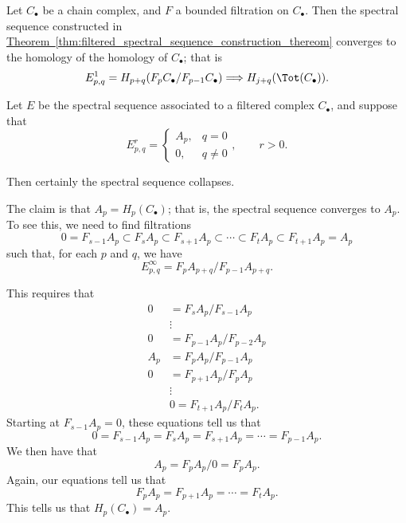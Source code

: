 \documentclass[main.tex]{subfiles}
\begin{document}
\begin{theorem}
  Let $C_{\bullet}$ be a chain complex, and $F$ a bounded filtration on $C_{\bullet}$. Then the spectral sequence constructed in \hyperref[thm:filtered_spectral_sequence_construction_thereom]{Theorem~\ref*{thm:filtered_spectral_sequence_construction_thereom}} converges to the homology of the homology of $C_{\bullet}$; that is
  \begin{equation*}
    E^{1}_{p,q} = H_{p+q}(F_{p}C_{\bullet}/F_{p-1}C_{\bullet}) \Longrightarrow H_{j+q}(\Tot(C_{\bullet})).
  \end{equation*}
\end{theorem}

\begin{example}
  Let $E$ be the spectral sequence associated to a filtered complex $C_{\bullet}$, and suppose that
  \begin{equation*}
    E^{r}_{p, q} =
    \begin{cases}
      A_{p}, &q = 0 \\
      0, &q \neq 0
    \end{cases},\qquad r > 0.
  \end{equation*}

  Then certainly the spectral sequence collapses.

  The claim is that $A_{p} = H_{p}(C_{\bullet})$; that is, the spectral sequence converges to $A_{p}$. To see this, we need to find filtrations
  \begin{equation*}
    0 = F_{s-1}A_{p} \subset F_{s}A_{p} \subset F_{s+1}A_{p} \subset \cdots \subset F_{t}A_{p} \subset F_{t+1}A_{p} = A_{p}
  \end{equation*}
  such that, for each $p$ and $q$, we have
  \begin{equation*}
    E^{\infty}_{p, q} = F_{p}A_{p+q}/F_{p-1}A_{p+q}.
  \end{equation*}

  This requires that
  \begin{align*}
    0 &= F_{s}A_{p}/F_{s-1}A_{p} \\
    &\vdots \\
    0 &= F_{p-1}A_{p}/F_{p-2}A_{p} \\
    A_{p} &= F_{p}A_{p}/F_{p-1}A_{p} \\
    0 &= F_{p+1}A_{p}/F_{p}A_{p} \\
    &\vdots \\
    & 0 = F_{t+1}A_{p}/F_{t}A_{p}.
  \end{align*}
  Starting at $F_{s-1}A_{p} = 0$, these equations tell us that
  \begin{equation*}
    0 = F_{s-1}A_{p} = F_{s}A_{p} = F_{s+1}A_{p} = \cdots = F_{p-1}A_{p}.
  \end{equation*}
  We then have that
  \begin{equation*}
    A_{p} = F_{p}A_{p}/0 = F_{p}A_{p}.
  \end{equation*}
  Again, our equations tell us that
  \begin{equation*}
    F_{p}A_{p} = F_{p+1}A_{p} = \cdots = F_{t}A_{p}.
  \end{equation*}
  This tells us that $H_{p}(C_{\bullet}) = A_{p}$.


\end{example}
\end{document}
